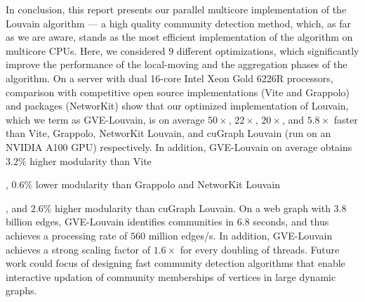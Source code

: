 In conclusion, this report presents our parallel multicore implementation of the Louvain algorithm --- a high quality community detection method, which, as far as we are aware, stands as the most efficient implementation of the algorithm on multicore CPUs. Here, we considered $9$ different optimizations, which significantly improve the performance of the local-moving and the aggregation phases of the algorithm. On a server with dual 16-core Intel Xeon Gold 6226R processors, comparison with competitive open source implementations (Vite and Grappolo) and packages (NetworKit) show that our optimized implementation of Louvain, which we term as GVE-Louvain, is on average $50\times$, $22\times$, $20\times$, and $5.8\times$ faster than Vite, Grappolo, NetworKit Louvain, and cuGraph Louvain (run on an NVIDIA A100 GPU) respectively. In addition, GVE-Louvain on average obtains $3.2\%$ higher modularity than Vite, $0.6\%$ lower modularity than Grappolo and NetworKit Louvain, and $2.6\%$ higher modularity than cuGraph Louvain. On a web graph with $3.8$ billion edges, GVE-Louvain identifies communities in $6.8$ seconds, and thus achieves a processing rate of $560$ million edges/s. In addition, GVE-Louvain achieves a strong scaling factor of $1.6\times$ for every doubling of threads. Future work could focus of designing fast community detection algorithms that enable interactive updation of community memberships of vertices in large dynamic graphs.
